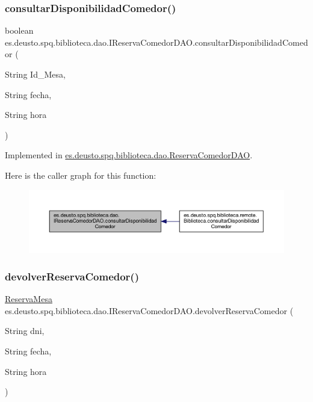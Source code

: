 \subsubsection{\texorpdfstring{consultar\+Disponibilidad\+Comedor()}{consultarDisponibilidadComedor()}}
{\footnotesize\ttfamily boolean es.\+deusto.\+spq.\+biblioteca.\+dao.\+I\+Reserva\+Comedor\+D\+A\+O.\+consultar\+Disponibilidad\+Comedor (\begin{DoxyParamCaption}\item[{String}]{Id\+\_\+\+Mesa,  }\item[{String}]{fecha,  }\item[{String}]{hora }\end{DoxyParamCaption})}



Implemented in \mbox{\hyperlink{classes_1_1deusto_1_1spq_1_1biblioteca_1_1dao_1_1_reserva_comedor_d_a_o_adf9fa1cb08488112692797e7959b2ef8}{es.\+deusto.\+spq.\+biblioteca.\+dao.\+Reserva\+Comedor\+D\+AO}}.

Here is the caller graph for this function\+:
\nopagebreak
\begin{figure}[H]
\begin{center}
\leavevmode
\includegraphics[width=350pt]{interfacees_1_1deusto_1_1spq_1_1biblioteca_1_1dao_1_1_i_reserva_comedor_d_a_o_aab673a0f8b0df9792d97189f934641af_icgraph}
\end{center}
\end{figure}
\mbox{\label{interfacees_1_1deusto_1_1spq_1_1biblioteca_1_1dao_1_1_i_reserva_comedor_d_a_o_a8e5a8ca90742ac0fc9231341e3a4fc5e}} 
\subsubsection{\texorpdfstring{devolver\+Reserva\+Comedor()}{devolverReservaComedor()}}
{\footnotesize\ttfamily \mbox{\hyperlink{classes_1_1deusto_1_1spq_1_1biblioteca_1_1data_1_1_reserva_mesa}{Reserva\+Mesa}} es.\+deusto.\+spq.\+biblioteca.\+dao.\+I\+Reserva\+Comedor\+D\+A\+O.\+devolver\+Reserva\+Comedor (\begin{DoxyParamCaption}\item[{String}]{dni,  }\item[{String}]{fecha,  }\item[{String}]{hora }\end{DoxyParamCaption})}



